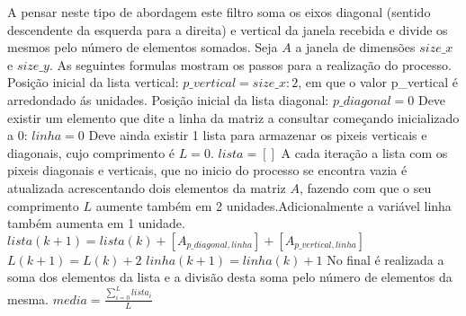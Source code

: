   A pensar neste tipo de abordagem este filtro soma os eixos diagonal (sentido descendente da esquerda para a direita) e vertical da janela recebida e divide os mesmos pelo número de elementos somados. Seja $A$ a janela de dimensões $size\_x$ e $size\_y$. As seguintes formulas mostram os passos para a realização do processo.\newline
  Posição inicial da lista vertical:\hfill\newline
  \hfill\newline
  $p\_vertical = size\_x : 2$, em que o valor p\_vertical é arredondado ás unidades.\hfill\newline
  \hfill\newline
  Posição inicial da lista diagonal:\hfill\newline
  \hfill\newline
  $p\_diagonal = 0$\hfill\newline
  \hfill\newline
  Deve existir um elemento que dite a linha da matriz a consultar começando inicializado a 0:\hfill\newline
  \hfill\newline
  $linha = 0$\hfill\newline
  \hfill\newline
  Deve ainda existir 1 lista para armazenar os pixeis verticais e diagonais, cujo comprimento é $L = 0$.\hfill\newline
  \hfill\newline
  $lista = []$\hfill\newline
  \hfill\newline
  A cada iteração a lista com os pixeis diagonais e verticais, que no inicio do processo se encontra vazia é atualizada acrescentando dois elementos da matriz $A$, fazendo com que o seu comprimento $L$ aumente também em 2 unidades.Adicionalmente a variável linha também aumenta em 1 unidade.\hfill\newline
  \hfill\newline
  $lista(k+1) = lista(k) + [ A_{p\_diagonal,linha}] + [ A_{p\_vertical,linha}]$\hfill\newline
  $L(k+1) = L(k) + 2$\hfill\newline
  $linha(k+1) = linha(k) + 1$\hfill\newline
  \hfill\newline
  No final é realizada a soma dos elementos da lista e a divisão  desta soma pelo número de elementos da mesma.\hfill\newline
  \hfill\newline
  $media = \frac{\sum_{i=0}^{L} lista_i}{L}$\hfill\newline
  \hfill\newline

